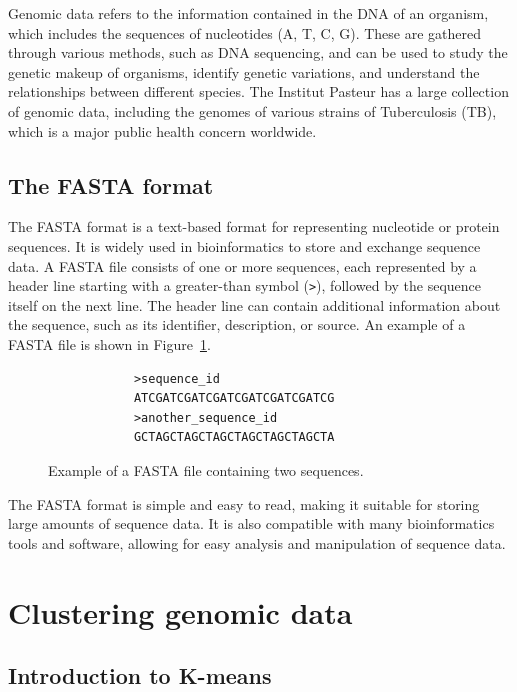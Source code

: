 Genomic data refers to the information contained in the DNA of an organism, which includes the sequences of nucleotides (A, T, C, G).
These are gathered through various methods, such as DNA sequencing, and can be used to study the genetic makeup of organisms,
identify genetic variations, and understand the relationships between different species. The Institut Pasteur has a large collection
of genomic data, including the genomes of various strains of Tuberculosis (TB), which is a major public health concern worldwide.

\section{The FASTA format}
\label{sec:fasta_format}

The FASTA format is a text-based format for representing nucleotide or protein sequences. It is widely used in bioinformatics
to store and exchange sequence data. A FASTA file consists of one or more sequences, each represented by a header line starting with
a greater-than symbol (\texttt{>}), followed by the sequence itself on the next line. The header line can contain additional
information about the sequence, such as its identifier, description, or source. An example of a FASTA file is shown in
Figure~\ref{fig:fasta_example}.

\begin{center}
	\begin{figure}[htbp]
		\begin{BVerbatim}
			>sequence_id
			ATCGATCGATCGATCGATCGATCGATCG
			>another_sequence_id
			GCTAGCTAGCTAGCTAGCTAGCTAGCTA
		\end{BVerbatim}
		\caption{Example of a FASTA file containing two sequences.}
		\label{fig:fasta_example}
	\end{figure}
\end{center}

The FASTA format is simple and easy to read, making it suitable for storing large amounts of sequence data. It is also compatible with
many bioinformatics tools and software, allowing for easy analysis and manipulation of sequence data.

\chapter{Clustering genomic data}
\label{chap:clustering_genomic_data}

\section{Introduction to K-means}
\label{sec:intro_kmeans}

